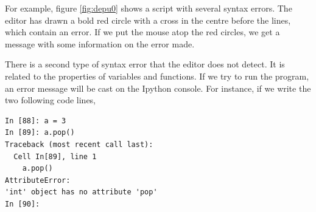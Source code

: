 \begin{paracol}{2}
For example, figure \ref{fig:depu0} shows a script with several syntax errors. The editor has drawn a bold red circle with a cross in the centre before the lines, which contain an error. If we put the mouse atop the red circles, we get a message with some information on the error made.

There is a second type of syntax error that the editor does not detect. It is related to the properties of variables and functions. If we try to run the program, an error message will be cast on the Ipython console. For instance, if we write the two following code lines, 
\end{paracol}
\begin{center}
    \begin{minipage}{.4\textwidth}
\begin{verbatim}
In [88]: a = 3
In [89]: a.pop()
Traceback (most recent call last):
  Cell In[89], line 1
    a.pop()
AttributeError: 
'int' object has no attribute 'pop'
In [90]:
\end{verbatim}
\end{minipage}
\end{center}

